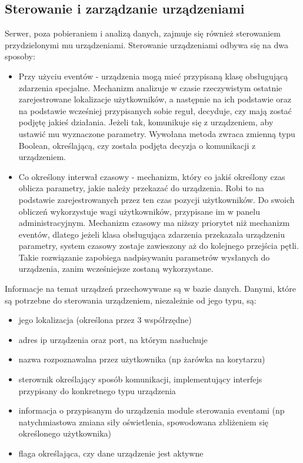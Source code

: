 \subsection{Sterowanie i zarządzanie urządzeniami}
Serwer, poza pobieraniem i analizą danych, zajmuje się również sterowaniem przydzielonymi mu urządzeniami. Sterowanie urządzeniami odbywa się na dwa sposoby:
\begin{itemize}
	\item Przy użyciu eventów - urządzenia mogą mieć przypisaną klasę obsługującą zdarzenia specjalne. Mechanizm analizuje w czasie rzeczywistym ostatnie zarejestrowane lokalizacje użytkowników, a następnie na ich podstawie oraz na podstawie wcześniej przypisanych sobie reguł, decyduje, czy mają zostać podjętę jakieś działania. Jeżeli tak, komunikuje się z urządzeniem, aby ustawić mu wyznaczone parametry. Wywołana metoda zwraca zmienną typu Boolean, określającą, czy została podjęta decyzja o komunikacji z urządzeniem.
	\item Co określony interwał czasowy - mechanizm, który co jakiś określony czas oblicza parametry, jakie należy przekazać do urządzenia. Robi to na podstawie zarejestrowanych przez ten czas pozycji użytkowników. Do swoich obliczeń wykorzystuje wagi użytkowników, przypisane im w panelu administracyjnym. Mechanizm czasowy ma niższy priorytet niż mechanizm eventów, dlatego jeżeli klasa obsługująca zdarzenia przekazała urządzeniu parametry, system czasowy zostaje zawieszony aż do kolejnego przejścia pętli. Takie rozwiązanie zapobiega nadpisywaniu parametrów wysłanych do urządzenia, zanim wcześniejsze zostaną wykorzystane.
\end{itemize}
Informacje na temat urządzeń przechowywane są w bazie danych. Danymi, które są potrzebne do sterowania urządzeniem, niezależnie od jego typu, są:
\begin{itemize}
	\item jego lokalizacja (określona przez 3 współrzędne)
	\item adres ip urządzenia oraz port, na którym nasłuchuje
	\item nazwa rozpoznawalna przez użytkownika (np żarówka na korytarzu)
	\item sterownik określający sposób komunikacji, implementujący interfejs przypisany do konkretnego typu urządzenia
	\item informacja o przypisanym do urządzenia module sterowania eventami (np natychmiastowa zmiana siły oświetlenia, spowodowana zbliżeniem się określonego użytkownika)
	\item flaga określająca, czy dane urządzenie jest aktywne
\end{itemize}
